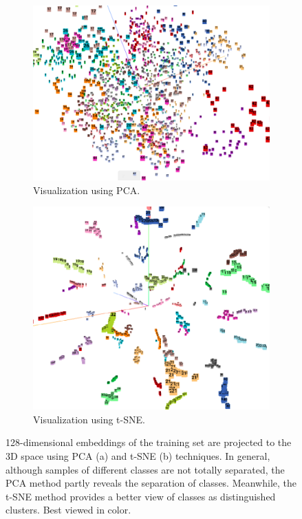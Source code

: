 \documentclass[journal, twocolumn]{IEEEtran}
\begin{document}
\begin{figure}
  \centering
  
  \begin{subfigure}[b]{\linewidth}
	\includegraphics[width=\linewidth]{img/pca3.png}
    \caption{Visualization using PCA.}
    \label{fig:pca}
  \end{subfigure}
  
  \hspace{3mm}
  
  \begin{subfigure}[b]{\linewidth}
	\includegraphics[width=\linewidth]{img/t-sne.png}
    \caption{Visualization using t-SNE.}
    \label{fig:t-sne}
  \end{subfigure}
  
  \caption{128-dimensional embeddings of the training set are projected to the 3D space using PCA (a) and t-SNE (b) techniques. In general, although samples of different classes are not totally separated, the PCA method partly reveals the separation of classes. Meanwhile, the t-SNE method provides a better view of classes as distinguished clusters. Best viewed in color.} 
  \label{fig:visualization}
\end{figure}
\end{document}
